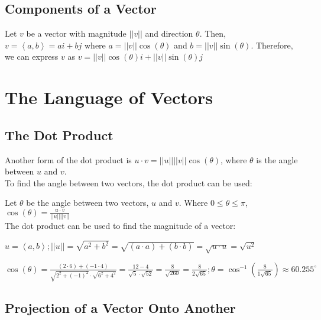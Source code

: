 \documentclass{report}
\begin{document}
\section{Components of a Vector}

Let $v$ be a vector with magnitude $||v||$ and direction $\theta$. Then, $v=\left\langle a,b \right\rangle=ai+bj$ where $a=||v||\cos(\theta)$ and $b=||v||\sin(\theta)$. Therefore, we can express $v$ as $v=||v||\cos(\theta)i+||v||\sin(\theta)j$

\chapter{The Language of Vectors}

\section{The Dot Product}


Another form of the dot product is $u \cdot v=||u||||v||\cos(\theta)$, where $\theta$ is the angle between $u$ and $v$.\\

To find the angle between two vectors, the dot product can be used:

Let $\theta$ be the angle between two vectors, $u$ and $v$. Where $0\le\theta\le\pi$, $\cos(\theta)=\frac{u \cdot v}{||u||||v||}$\\

The dot product can be used to find the magnitude of a vector:

$u=\left\langle a,b \right\rangle;||u||=\sqrt{a^2+b^2}=\sqrt{(a \cdot a)+(b \cdot b)}=\sqrt{u \cdot u}=\sqrt{u^2}$



\sol $\cos(\theta)=\frac{(2 \cdot 6)+(-1 \cdot 4)}{\sqrt{2^2+(-1)^2}\cdot\sqrt{6^2+4^2}}=\frac{12-4}{\sqrt{5}\cdot\sqrt{52}}=\frac{8}{\sqrt{260}}=\frac{8}{2\sqrt{65}};\theta=\cos^{-1}(\frac{8}{1\sqrt{65}})\approx \boxed{60.255^\circ}$

\section{Projection of a Vector Onto Another}
\end{document}

